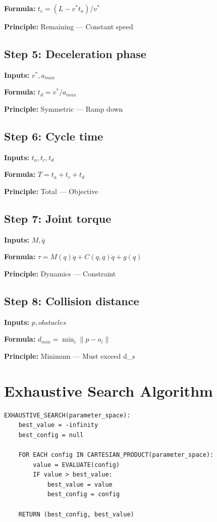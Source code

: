 \documentclass[11pt,twocolumn]{article}
\begin{document}
\textbf{Formula:} $t_c = (L - v^* t_a)/v^*$

\textbf{Principle:} Remaining --- Constant speed

\subsection*{Step 5: Deceleration phase}
\textbf{Inputs:} $v^*, a_{max}$

\textbf{Formula:} $t_d = v^*/a_{max}$

\textbf{Principle:} Symmetric --- Ramp down

\subsection*{Step 6: Cycle time}
\textbf{Inputs:} $t_a, t_c, t_d$

\textbf{Formula:} $T = t_a + t_c + t_d$

\textbf{Principle:} Total --- Objective

\subsection*{Step 7: Joint torque}
\textbf{Inputs:} $M, \ddot{q}$

\textbf{Formula:} $\tau = M(q)\ddot{q} + C(q,\dot{q})\dot{q} + g(q)$

\textbf{Principle:} Dynamics --- Constraint

\subsection*{Step 8: Collision distance}
\textbf{Inputs:} $p, obstacles$

\textbf{Formula:} $d_{min} = \min_i \|p - o_i\|$

\textbf{Principle:} Minimum --- Must exceed d_s


\section{Exhaustive Search Algorithm}

\begin{verbatim}
EXHAUSTIVE_SEARCH(parameter_space):
    best_value = -infinity
    best_config = null
    
    FOR EACH config IN CARTESIAN_PRODUCT(parameter_space):
        value = EVALUATE(config)
        IF value > best_value:
            best_value = value
            best_config = config
    
    RETURN (best_config, best_value)
\end{verbatim}
\end{document}
